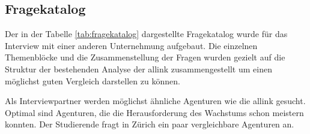 \subsection{Fragekatalog}
Der in der Tabelle \ref{tab:fragekatalog} dargestellte Fragekatalog wurde für 
das Interview mit einer anderen Unternehmung aufgebaut. Die einzelnen Themenblöcke 
und die Zusammenstellung der Fragen wurden gezielt auf die Struktur der bestehenden 
Analyse der allink zusammengestellt um einen möglichst guten Vergleich darstellen 
zu können.

Als Interviewpartner werden möglichst ähnliche Agenturen wie die allink gesucht.
Optimal sind Agenturen, die die Herausforderung des Wachstums schon meistern
konnten. Der Studierende fragt in Zürich ein paar vergleichbare Agenturen an.

